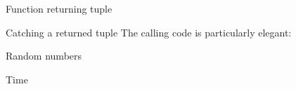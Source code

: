 \begin{slide}{Function returning tuple}
  \label{sl:tuplefun}
  \begin{multicols}{2}
    \columnbreak
  \end{multicols}
\end{slide}

\begin{block}{Catching a returned tuple}
  \label{sl:catch-tuple}
  The calling code is particularly elegant:
\end{block}

 {Random numbers}

 {Time}

